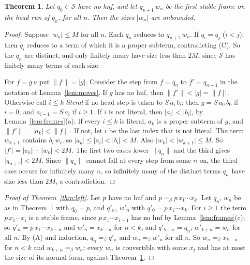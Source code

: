 \documentclass[11pt]{amsart}
\newtheorem{theorem}{Theorem}
\newcommand{\Ter}{\mathcal S}
\newcommand{\conv}{=_\beta}
\newcommand{\sz}[1]{\lvert#1\rvert}
\begin{document}
\begin{theorem}\label{thm:teeth}
Let $q_0\in\Ter$ have no hnf, and let $q_{n+1}\,w_n$ be the first stable frame on the head run of
$q_n$, for all $n$. Then the sizes $\sz{w_n}$ are unbounded.
\end{theorem}

\begin{proof}
Suppose $\sz{w_n}\le M$ for all $n$. Each $q_n$ reduces to $q_{n+1}\,w_n$. If $q_i=q_j$ ($i<j$),
then $q_i$ reduces to a term of which it is a proper subterm, contradicting (C). So the $q_n$ are
distinct, and only finitely many have size less than $2M$, since $\Ter$ has finitely many terms of
each size.

For $f=g\,u$ put $\|f\|=\sz g$. Consider the step from $f=q_n$ to $f'=q_{n+1}$ in the notation of
Lemma~\ref{lem:moves}. If $g$ has no hnf, then $\|f'\|<\sz g=\|f\|$. Otherwise call $i\le k$
\emph{literal} if no head step is taken to $S\,a_i\,b_i$: then $g=S\,a_0\,b_0$ if $i=0$, and
$a_{i-1}=S\,a_i$ if $i\ge1$. If $i$ is not literal, then $\sz{a_i}<\sz{b_i}$, by
Lemma~\ref{lem:frames}(a). If every $i\le k$ is literal, $a_k$ is a proper subterm of $g$, and
$\|f'\|=\sz{a_k}<\|f\|$. If not, let $i$ be the last index that is not literal. The term $w_{k+1}$
contains $b_i\,w_i$, so $\sz{a_k}\le\sz{a_i}<\sz{b_i}<M$. Also $\sz{w_k}<\sz{w_{k+1}}\le M$. So
$\sz{f'}=\sz{a_k}+\sz{w_k}<2M$. The first two cases lower $\|q_n\|$ and the third gives
$\sz{q_{n+1}}<2M$. Since $\|q_n\|$ cannot fall at every step from some $n$ on, the third case
occurs for infinitely many $n$, so infinitely many of the distinct terms $q_n$ have size less than
$2M$, a contradiction.
\end{proof}

\begin{proof}[Proof of Theorem~\ref{thm:left}]
Let $p$ have no hnf and $p\conv p\,x_1\cdots x_k$. Let $q_n$, $w_n$ be as in
Theorem~\ref{thm:teeth} with $q_0=p$, and $q'_n$, $w'_n$ with $q'_0=p\,x_1\cdots x_k$. For
$i\ge1$ the term $p\,x_1\cdots x_i$ is a stable frame, since $p\,x_1\cdots x_{i-1}$ has no hnf by
Lemma~\ref{lem:frames}(c); so $q'_n=p\,x_1\cdots x_{k-n}$ and
$w'_n=x_{k-n}$ for $n<k$, and $q'_{k+n}=q_n$, $w'_{k+n}=w_n$ for all $n$. By (A) and induction,
$q_n\conv q'_n$ and $w_n\conv w'_n$ for all $n$. So $w_n\conv x_{k-n}$ for $n<k$ and
$w_{k+n}\conv w_n$: every $w_n$ is convertible with some $x_j$ and has at most the size of its
normal form, against Theorem~\ref{thm:teeth}.
\end{proof}
\end{document}
